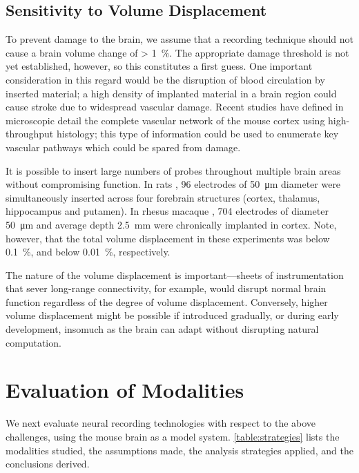 \subsection{Sensitivity to Volume Displacement}

To prevent damage to the brain, we assume that a recording technique should not cause a brain volume change of \SI{> 1}{\percent}. The appropriate damage threshold is not yet established, however, so this constitutes a first guess. One important consideration in this regard would be the disruption of blood circulation by inserted material; a high density of implanted material in a brain region could cause stroke due to widespread vascular damage. Recent studies \cite{Kleinfeld2013} have defined in microscopic detail the complete vascular network of the mouse cortex using high-throughput histology; this type of information could be used to enumerate key vascular pathways which could be spared from damage.

It is possible to insert large numbers of probes throughout multiple brain areas without compromising function. In rats \cite{Ribeiro2004}, 96 electrodes of \SI{50}{\micro\meter} diameter were simultaneously inserted across four forebrain structures (cortex, thalamus, hippocampus and putamen). In rhesus macaque \cite{Nicolelis2003}, 704 electrodes of diameter \SI{50}{\micro\meter} and average depth \SI{2.5}{\milli\meter} were chronically implanted in cortex. Note, however, that the total volume displacement in these experiments was below \SI{0.1}{\percent}, and below \SI{0.01}{\percent}, respectively. 

The nature of the volume displacement is important---sheets of instrumentation that sever long-range connectivity, for example, would disrupt normal brain function regardless of the degree of volume displacement.
Conversely, higher volume displacement might be possible if introduced gradually, or during early development, insomuch as the brain can adapt without disrupting natural computation.

\section{Evaluation of Modalities}

We next evaluate neural recording technologies with respect to the above challenges, using the mouse brain as a model system.
\autoref{table:strategies} lists the modalities studied, the assumptions made, the analysis strategies applied, and the conclusions derived.

